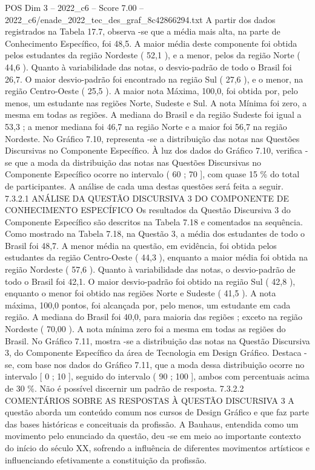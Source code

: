 \begin{textsample}{POS Dim 3 – 2022\_c6 – Score 7.00 – 2022\_c6/enade\_2022\_tec\_des\_graf\_8c42866294.txt}
A partir dos dados registrados na Tabela 17.7, observa -se que a média mais alta, na parte de Conhecimento Específico, foi 48,5.
A maior média deste componente foi obtida pelos estudantes da região Nordeste ( 52,1 ), e a menor, pelos da região Norte ( 44,6 ).
Quanto à variabilidade das notas, o desvio-padrão de todo o Brasil foi 26,7.
O maior desvio-padrão foi encontrado na região Sul ( 27,6 ), e o menor, na região Centro-Oeste ( 25,5 ).
A maior nota Máxima, 100,0, foi obtida por, pelo menos, um estudante nas regiões Norte, Sudeste e Sul.
A nota Mínima foi zero, a mesma em todas as regiões.
A mediana do Brasil e da região Sudeste foi igual a 53,3 ; a menor mediana foi 46,7 na região Norte e a maior foi 56,7 na região Nordeste.
No Gráfico 7.10, representa -se a distribuição das notas nas Questões Discursivas no Componente Específico.
À luz dos dados do Gráfico 7.10, verifica -se que a moda da distribuição das notas nas Questões Discursivas no Componente Específico ocorre no intervalo ( 60 ; 70 ], com quase 15 \% do total de participantes.
A análise de cada uma destas questões será feita a seguir. 7.3.2.1 ANÁLISE DA QUESTÃO DISCURSIVA 3 DO COMPONENTE DE CONHECIMENTO ESPECÍFICO Os resultados da Questão Discursiva 3 do Componente Específico são descritos na Tabela 7.18 e comentados na sequência.
Como mostrado na Tabela 7.18, na Questão 3, a média dos estudantes de todo o Brasil foi 48,7.
A menor média na questão, em evidência, foi obtida pelos estudantes da região Centro-Oeste ( 44,3 ), enquanto a maior média foi obtida na região Nordeste ( 57,6 ).
Quanto à variabilidade das notas, o desvio-padrão de todo o Brasil foi 42,1.
O maior desvio-padrão foi obtido na região Sul ( 42,8 ), enquanto o menor foi obtido nas regiões Norte e Sudeste ( 41,5 ).
A nota máxima, 100,0 pontos, foi alcançada por, pelo menos, um estudante em cada região.
A mediana do Brasil foi 40,0, para maioria das regiões ; exceto na região Nordeste ( 70,00 ).
A nota mínima zero foi a mesma em todas as regiões do Brasil.
No Gráfico 7.11, mostra -se a distribuição das notas na Questão Discursiva 3, do Componente Específico da área de Tecnologia em Design Gráfico.
Destaca -se, com base nos dados do Gráfico 7.11, que a moda dessa distribuição ocorre no intervalo [ 0 ; 10 ], seguido do intervalo ( 90 ; 100 ], ambos com percentuais acima de 30 \%.
Não é possível discernir um padrão de resposta. 7.3.2.2 COMENTÁRIOS SOBRE AS RESPOSTAS À QUESTÃO DISCURSIVA 3 A questão aborda um conteúdo comum nos cursos de Design Gráfico e que faz parte das bases históricas e conceituais da profissão.
A Bauhaus, entendida como um movimento pelo enunciado da questão, deu -se em meio ao importante contexto do início do século XX, sofrendo a influência de diferentes movimentos artísticos e influenciando efetivamente a constituição da profissão.

\end{textsample}
